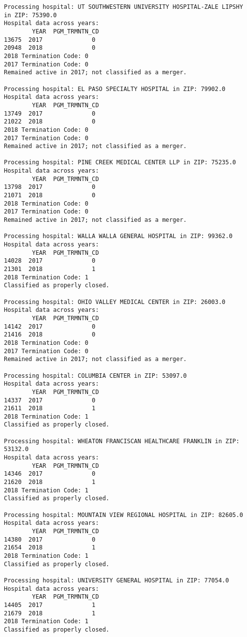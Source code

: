 \documentclass[
  letterpaper,
  DIV=11,
  numbers=noendperiod]{scrartcl}
\begin{document}
\begin{verbatim}
Processing hospital: UT SOUTHWESTERN UNIVERSITY HOSPITAL-ZALE LIPSHY in ZIP: 75390.0
Hospital data across years:
        YEAR  PGM_TRMNTN_CD
13675  2017              0
20948  2018              0
2018 Termination Code: 0
2017 Termination Code: 0
Remained active in 2017; not classified as a merger.

Processing hospital: EL PASO SPECIALTY HOSPITAL in ZIP: 79902.0
Hospital data across years:
        YEAR  PGM_TRMNTN_CD
13749  2017              0
21022  2018              0
2018 Termination Code: 0
2017 Termination Code: 0
Remained active in 2017; not classified as a merger.

Processing hospital: PINE CREEK MEDICAL CENTER LLP in ZIP: 75235.0
Hospital data across years:
        YEAR  PGM_TRMNTN_CD
13798  2017              0
21071  2018              0
2018 Termination Code: 0
2017 Termination Code: 0
Remained active in 2017; not classified as a merger.

Processing hospital: WALLA WALLA GENERAL HOSPITAL in ZIP: 99362.0
Hospital data across years:
        YEAR  PGM_TRMNTN_CD
14028  2017              0
21301  2018              1
2018 Termination Code: 1
Classified as properly closed.

Processing hospital: OHIO VALLEY MEDICAL CENTER in ZIP: 26003.0
Hospital data across years:
        YEAR  PGM_TRMNTN_CD
14142  2017              0
21416  2018              0
2018 Termination Code: 0
2017 Termination Code: 0
Remained active in 2017; not classified as a merger.

Processing hospital: COLUMBIA CENTER in ZIP: 53097.0
Hospital data across years:
        YEAR  PGM_TRMNTN_CD
14337  2017              0
21611  2018              1
2018 Termination Code: 1
Classified as properly closed.

Processing hospital: WHEATON FRANCISCAN HEALTHCARE FRANKLIN in ZIP: 53132.0
Hospital data across years:
        YEAR  PGM_TRMNTN_CD
14346  2017              0
21620  2018              1
2018 Termination Code: 1
Classified as properly closed.

Processing hospital: MOUNTAIN VIEW REGIONAL HOSPITAL in ZIP: 82605.0
Hospital data across years:
        YEAR  PGM_TRMNTN_CD
14380  2017              0
21654  2018              1
2018 Termination Code: 1
Classified as properly closed.

Processing hospital: UNIVERSITY GENERAL HOSPITAL in ZIP: 77054.0
Hospital data across years:
        YEAR  PGM_TRMNTN_CD
14405  2017              1
21679  2018              1
2018 Termination Code: 1
Classified as properly closed.


\end{verbatim}
\end{document}
